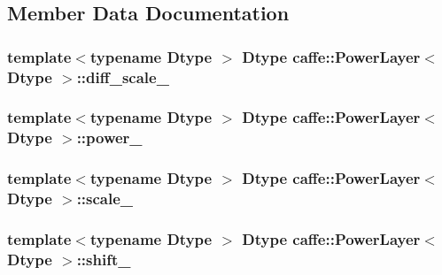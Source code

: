 \subsection{Member Data Documentation}
\hypertarget{classcaffe_1_1_power_layer_aa83169eaa1b573137aa6ed2b526879f0}{
\subsubsection[{diff\+\_\+scale\+\_\+}]{\setlength{\rightskip}{0pt plus 5cm}template$<$typename Dtype $>$ Dtype {\bf caffe\+::\+Power\+Layer}$<$ Dtype $>$\+::diff\+\_\+scale\+\_\+\hspace{0.3cm}{\ttfamily [protected]}}}\label{classcaffe_1_1_power_layer_aa83169eaa1b573137aa6ed2b526879f0}
\hypertarget{classcaffe_1_1_power_layer_a882ce133988e4dd72a10d87fec4c04c3}{
\subsubsection[{power\+\_\+}]{\setlength{\rightskip}{0pt plus 5cm}template$<$typename Dtype $>$ Dtype {\bf caffe\+::\+Power\+Layer}$<$ Dtype $>$\+::power\+\_\+\hspace{0.3cm}{\ttfamily [protected]}}}\label{classcaffe_1_1_power_layer_a882ce133988e4dd72a10d87fec4c04c3}
\hypertarget{classcaffe_1_1_power_layer_a6684b2c6c2b2047d58c9d2809b86c39c}{
\subsubsection[{scale\+\_\+}]{\setlength{\rightskip}{0pt plus 5cm}template$<$typename Dtype $>$ Dtype {\bf caffe\+::\+Power\+Layer}$<$ Dtype $>$\+::scale\+\_\+\hspace{0.3cm}{\ttfamily [protected]}}}\label{classcaffe_1_1_power_layer_a6684b2c6c2b2047d58c9d2809b86c39c}
\hypertarget{classcaffe_1_1_power_layer_a3a3143c4d6735d12cb5a41b1cb623bc9}{
\subsubsection[{shift\+\_\+}]{\setlength{\rightskip}{0pt plus 5cm}template$<$typename Dtype $>$ Dtype {\bf caffe\+::\+Power\+Layer}$<$ Dtype $>$\+::shift\+\_\+\hspace{0.3cm}{\ttfamily [protected]}}}\label{classcaffe_1_1_power_layer_a3a3143c4d6735d12cb5a41b1cb623bc9}


